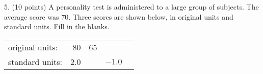 \documentclass[10pt]{article}
\begin{document}
5. (10 points)  A personality test is administered to a large group of subjects.  
The average score was 70.
Three scores are shown below, in original units and standard units.  Fill in the blanks.\vspace{-5pt}
\newcommand{\bl}{\underbar{\hspace{20pt}}}
\begin{center}
{\setlength{\tabcolsep}{20pt}\begin{tabular}{lrrrr}
original units: & 80 & 65   & \bl\\[15pt]
standard units: & 2.0 & \bl &  $-1.0$
\end{tabular}}
\end{center}
\vfill
\eject
\end{document}
